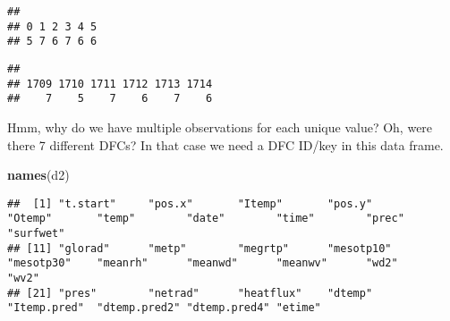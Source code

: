 \documentclass[
]{article}
\newenvironment{Shaded}{\begin{snugshade}}{\end{snugshade}}
\newcommand{\FunctionTok}[1]{\textcolor[rgb]{0.13,0.29,0.53}{\textbf{#1}}}
\newcommand{\NormalTok}[1]{#1}
\newcommand{\SpecialCharTok}[1]{\textcolor[rgb]{0.81,0.36,0.00}{\textbf{#1}}}
\begin{document}
\begin{Shaded}
\end{Shaded}

\begin{verbatim}
## 
## 0 1 2 3 4 5 
## 5 7 6 7 6 6
\end{verbatim}

\begin{Shaded}
\end{Shaded}

\begin{verbatim}
## 
## 1709 1710 1711 1712 1713 1714 
##    7    5    7    6    7    6
\end{verbatim}

Hmm, why do we have multiple observations for each unique value? Oh,
were there 7 different DFCs? In that case we need a DFC ID/key in this
data frame.

\begin{Shaded}
\begin{Highlighting}[]
\FunctionTok{names}\NormalTok{(d2)}
\end{Highlighting}
\end{Shaded}

\begin{verbatim}
##  [1] "t.start"     "pos.x"       "Itemp"       "pos.y"       "Otemp"       "temp"        "date"        "time"        "prec"        "surfwet"    
## [11] "glorad"      "metp"        "megrtp"      "mesotp10"    "mesotp30"    "meanrh"      "meanwd"      "meanwv"      "wd2"         "wv2"        
## [21] "pres"        "netrad"      "heatflux"    "dtemp"       "Itemp.pred"  "dtemp.pred2" "dtemp.pred4" "etime"
\end{verbatim}
\end{document}
